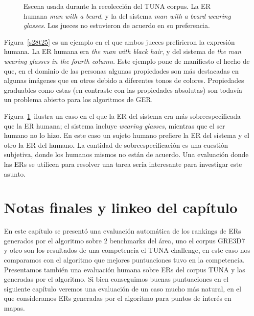 \begin{figure}[H]
\begin{minipage}{0.48\linewidth}
\vspace*{-.3cm}
\caption{Escena usada durante la recolecci\'on del TUNA corpus. La ER humana \emph{man with a beard},  y la del sistema \emph{man with a beard wearing glasses}. Los jueces no estuvieron de acuerdo en su preferencia.}
\label{s307t21}
\end{minipage}
\end{figure}

Figura~\ref{s28t25} es un ejemplo en el que ambos jueces prefirieron la expresi\'on humana. La ER humana era {\it the man with black hair}, y del sistema de {\it the man wearing glasses in the fourth column}. Este ejemplo pone de manifiesto el hecho de que, en el dominio de las personas algunas propiedades son m\'as destacadas en algunas im\'agenes que en otros debido a diferentes tonos de colores. Propiedades graduables como estas (en contraste con las propiedades absolutas) son todav\'{i}a un problema abierto para los algoritmos de GER.

Figura~\ref{s307t21}~ilustra un caso en el que la ER del sistema era m\'as sobreespecificada que la ER humana; el sistema incluye {\it wearing glasses}, mientras que el ser humano no lo hizo. En este caso un sujeto humano prefiere la ER del sistema y el otro la ER del humano. La cantidad de sobreespecificaci\'on es una cuesti\'on subjetiva, donde los humanos mismos no est\'an de acuerdo. Una evaluaci\'on donde las ERs se utilicen para resolver una tarea ser\'{i}a interesante para investigar este asunto.

\section{Notas finales y linkeo del cap\'itulo}\label{sec:notas5}

En este cap\'itulo se present\'o una evaluaci\'on autom\'atica de los rankings de ERs generados por el algoritmo sobre 2 benchmarks del \'area, uno el corpus GRE3D7 y otro son los resultados de una competencia el TUNA challenge, en este caso nos comparamos con el algoritmo que mejores puntuaciones tuvo en la competencia. Presentamos tambi\'en una evaluaci\'on humana sobre ERs del corpus TUNA y las generadas por el algoritmo. Si bien conseguimos buenas puntuaciones en el siguiente cap\'itulo veremos una evaluaci\'on de un caso mucho m\'as natural, en el que consideramos ERs generadas por el algoritmo para puntos de inter\'es en mapas. 
